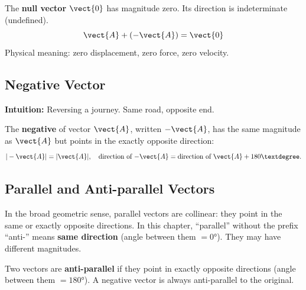 \begin{definitionbox}
The \textbf{null vector} $\vect{0}$ has magnitude zero.
Its direction is indeterminate (undefined).
\[
  \vect{A} + (-\vect{A}) = \vect{0}
\]
Physical meaning: zero displacement, zero force, zero
velocity.
\end{definitionbox}

\subsection*{Negative Vector}

\textbf{Intuition:} Reversing a journey. Same road,
opposite end.

\begin{definitionbox}
The \textbf{negative} of vector $\vect{A}$, written
$-\vect{A}$, has the same magnitude as $\vect{A}$ but
points in the exactly opposite direction:
\[
  |-\vect{A}| = |\vect{A}|,\quad
  \text{direction of } {-\vect{A}}
  = \text{direction of } \vect{A} + 180°.
\]
\end{definitionbox}

\subsection*{Parallel and Anti-parallel Vectors}

\begin{definitionbox}
In the broad geometric sense, parallel vectors are collinear:
they point in the same or exactly opposite directions. In this
chapter, ``parallel'' without the prefix ``anti-'' means
\textbf{same direction} (angle between them $= 0°$).
They may have different magnitudes.
\end{definitionbox}

\begin{definitionbox}
Two vectors are \textbf{anti-parallel} if they point
in exactly opposite directions (angle between them
$= 180°$). A negative vector is always anti-parallel
to the original.
\end{definitionbox}

\begin{diagbox}
\begin{center}
\end{center}
\end{diagbox}

